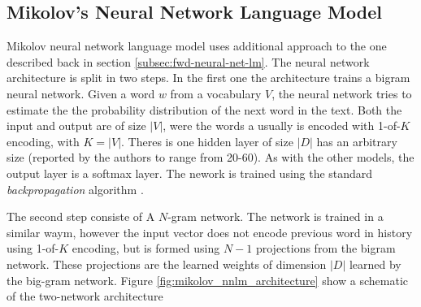





\subsection{Mikolov's Neural Network Language Model}
\label{sec:mikolov-neural-net-model}

Mikolov neural network language model uses additional approach to the one
described back in section \ref{subsec:fwd-neural-net-lm}.  The neural network
architecture is split in two steps. In the first one the architecture trains
a bigram neural network. Given a word $w$ from a vocabulary $V$, the neural
network tries to estimate the the probability distribution of the next word
in the text. Both the input and output are of size $|V|$, were the words a
usually is encoded with 1-of-$K$ encoding, with $K=|V|$.  Theres is one hidden layer of
size $|D|$ has an arbitrary size (reported by the authors  to range from 20-60). As with the
other models, the output layer  is a  softmax layer. The nework is trained
using the standard \textit{backpropagation} algorithm
\cite{conf/icassp/MikolovKBGC09}. 

The second step consiste of  A $N$-gram network. The network is trained in a
similar waym, however the input vector does not encode previous word in
history using 1-of-$K$ encoding, but is formed using $N-1$ projections from
the  bigram network. These projections are the learned weights of dimension
$|D|$ learned by the big-gram network. Figure \ref{fig:mikolov_nnlm_architecture} show a schematic of the
two-network architecture 


